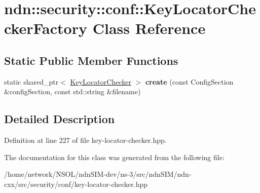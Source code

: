 \hypertarget{classndn_1_1security_1_1conf_1_1KeyLocatorCheckerFactory}{}\section{ndn\+:\+:security\+:\+:conf\+:\+:Key\+Locator\+Checker\+Factory Class Reference}
\label{classndn_1_1security_1_1conf_1_1KeyLocatorCheckerFactory}
\subsection*{Static Public Member Functions}
\begin{DoxyCompactItemize}
\item 
static shared\+\_\+ptr$<$ \hyperlink{classndn_1_1security_1_1conf_1_1KeyLocatorChecker}{Key\+Locator\+Checker} $>$ {\bfseries create} (const Config\+Section \&config\+Section, const std\+::string \&filename)\hypertarget{classndn_1_1security_1_1conf_1_1KeyLocatorCheckerFactory_a1af8b4cf696a182bc963c71b6aae1c1a}{}\label{classndn_1_1security_1_1conf_1_1KeyLocatorCheckerFactory_a1af8b4cf696a182bc963c71b6aae1c1a}

\end{DoxyCompactItemize}


\subsection{Detailed Description}


Definition at line 227 of file key-\/locator-\/checker.\+hpp.



The documentation for this class was generated from the following file\+:\begin{DoxyCompactItemize}
\item 
/home/network/\+N\+S\+O\+L/ndn\+S\+I\+M-\/dev/ns-\/3/src/ndn\+S\+I\+M/ndn-\/cxx/src/security/conf/key-\/locator-\/checker.\+hpp\end{DoxyCompactItemize}
